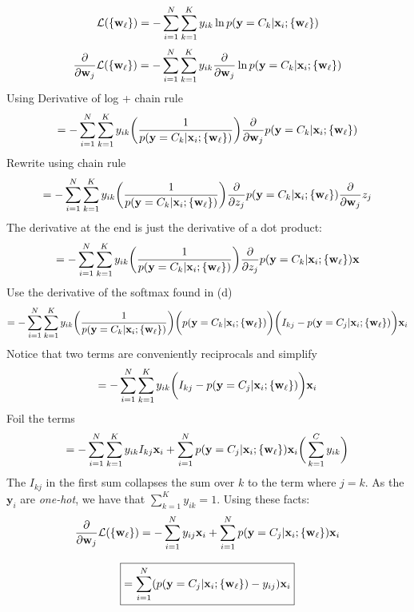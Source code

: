 \documentclass[12pt,letterpaper]{article}
\begin{document}
\begin{enumerate}
\begin{enumerate}
            $$
            \mathcal{L}(\{\mathbf{w}_{\ell}\}) = -\sum_{i=1}^N\sum_{k=1}^K y_{ik} \ln p(\mathbf{y} = C_k | \mathbf{x}_i; \{\mathbf{w}_\ell\})
            $$
            $$\frac{\partial }{\partial \mathbf{w}_j} \mathcal{L}(\{\mathbf{w}_{\ell}\}) =-\sum_{i=1}^N\sum_{k=1}^K y_{ik}\frac{\partial }{\partial \mathbf{w}_j} \ln p(\mathbf{y} = C_k | \mathbf{x}_i; \{\mathbf{w}_\ell\})
            $$
            \noindent Using Derivative of log + chain rule
            $$=-\sum_{i=1}^N\sum_{k=1}^K y_{ik}\bigg(\frac{1}{p(\mathbf{y} = C_k | \mathbf{x}_i; \{\mathbf{w}_\ell\})}\bigg)\frac{\partial }{\partial \mathbf{w}_j}p(\mathbf{y} = C_k | \mathbf{x}_i; \{\mathbf{w}_\ell\})$$
            \noindent Rewrite using chain rule
            $$ =-\sum_{i=1}^N\sum_{k=1}^K y_{ik}\bigg(\frac{1}{p(\mathbf{y} = C_k | \mathbf{x}_i; \{\mathbf{w}_\ell\})}\bigg)
               \frac{\partial }{\partial z_j} p(\mathbf{y} = C_k | \mathbf{x}_i; \{\mathbf{w}_\ell\}) \frac{\partial }{\partial \mathbf{w}_j} z_j$$
            The derivative at the end is just the derivative of a dot product:
            $$ =-\sum_{i=1}^N\sum_{k=1}^K y_{ik}\bigg(\frac{1}{p(\mathbf{y} = C_k | \mathbf{x}_i; \{\mathbf{w}_\ell\})}\bigg)
               \frac{\partial }{\partial z_j} p(\mathbf{y} = C_k | \mathbf{x}_i; \{\mathbf{w}_\ell\}) \mathbf{x}$$
            Use the derivative of the softmax found in (d)
            $$ = -\sum_{i=1}^N\sum_{k=1}^K y_{ik}\bigg(\frac{1}{p(\mathbf{y} = C_k | \mathbf{x}_i; \{\mathbf{w}_\ell\})}\bigg)
            \bigg(p(\mathbf{y} = C_k | \mathbf{x}_i; \{\mathbf{w}_\ell\})\bigg)\bigg(I_{kj} - p(\mathbf{y} = C_j | \mathbf{x}_i; \{\mathbf{w}_\ell\})\bigg) \mathbf{x}_i$$
            Notice that two terms are conveniently reciprocals and simplify
        $$= -\sum_{i=1}^N\sum_{k=1}^K y_{ik}\bigg(I_{kj} - p(\mathbf{y} = C_j | \mathbf{x}_i; \{\mathbf{w}_\ell\})\bigg)\mathbf{x}_i$$
        Foil the terms
        $$= -\sum_{i=1}^N\sum_{k=1}^K y_{ik}I_{kj}\mathbf{x}_i + \sum_{i=1}^N p(\mathbf{y} = C_j | \mathbf{x}_i; \{\mathbf{w}_\ell\})\mathbf{x}_i \bigg(\sum_{k=1}^C y_{ik}
        \bigg)$$
        The $I_{kj}$ in the first sum collapses the sum over $k$ to the term where $j=k$. As the $\mathbf{y}_{i}$ are \textit{one-hot}, 
        we have that $\sum_{k=1}^K y_{ik}=1$. Using these facts:
        $$ \frac{\partial }{\partial \mathbf{w}_j} \mathcal{L}(\{\mathbf{w}_{\ell}\}) = -\sum_{i=1}^N y_{ij}\mathbf{x}_i + \sum_{i=1}^N p(\mathbf{y} = C_j | \mathbf{x}_i; \{\mathbf{w}_\ell\})\mathbf{x}_i $$
        
        $$\boxed{ =
        \sum_{i=1}^N (p(\mathbf{y} = C_j | \mathbf{x}_i; \{\mathbf{w}_\ell\}) - y_{ij})\mathbf{x}_i}
        $$
        
       


        \end{enumerate}

  \end{enumerate}
\end{document}
